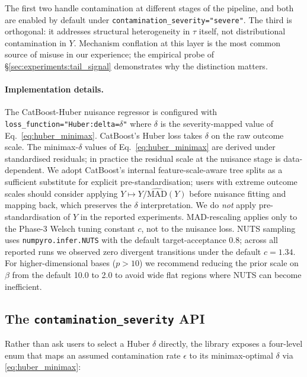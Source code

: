 The first two handle contamination at different stages of the
pipeline, and both are enabled by default under
\texttt{contamination\_severity="severe"}. The third is orthogonal:
it addresses structural heterogeneity in $\tau$ itself, not
distributional contamination in $Y$. Mechanism conflation at this
layer is the most common source of misuse in our experience; the
empirical probe of \S\ref{sec:experiments:tail_signal}
demonstrates why the distinction matters.

\paragraph{Implementation details.}
The CatBoost-Huber nuisance regressor is configured with
\texttt{loss\_function="Huber:delta=$\delta$"} where $\delta$ is the
severity-mapped value of Eq.~\eqref{eq:huber_minimax}. CatBoost's
Huber loss takes $\delta$ on the raw outcome scale. The
minimax-$\delta$ values of Eq.~\eqref{eq:huber_minimax} are derived
under standardised residuals; in practice the residual scale at
the nuisance stage is data-dependent. We adopt CatBoost's
internal feature-scale-aware tree splits as a sufficient
substitute for explicit pre-standardisation; users with extreme
outcome scales should consider applying
$Y \mapsto Y/\widehat{\mathrm{MAD}}(Y)$ before nuisance fitting and
mapping back, which preserves the $\delta$ interpretation. We do
\emph{not} apply pre-standardisation of $Y$ in the reported
experiments. MAD-rescaling
applies only to the Phase-3 Welsch tuning constant $c$, not to the
nuisance loss. NUTS sampling uses
\texttt{numpyro.infer.NUTS} with the default target-acceptance 0.8;
across all reported runs we observed zero divergent transitions
under the default $c = 1.34$. For higher-dimensional bases
($p > 10$) we recommend reducing the prior scale on $\beta$ from
the default 10.0 to 2.0 to avoid wide flat regions where NUTS can
become inefficient.

\subsection{The \texttt{contamination\_severity} API}
\label{sec:method:severity}
Rather than ask users to select a Huber $\delta$ directly, the
library exposes a four-level enum that maps an assumed contamination
rate $\epsilon$ to its minimax-optimal $\delta$ via
\eqref{eq:huber_minimax}:

